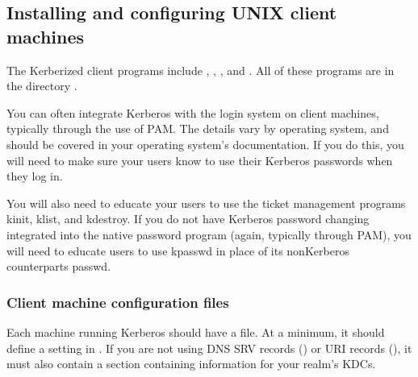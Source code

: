 \documentclass[letterpaper,10pt,english]{sphinxmanual}
\begin{document}
\subsection{Installing and configuring UNIX client machines}
\label{\detokenize{admin/install_clients:installing-and-configuring-unix-client-machines}}\label{\detokenize{admin/install_clients::doc}}
\sphinxAtStartPar
The Kerberized client programs include ,
, , and .  All of
these programs are in the directory {\hyperref[\detokenize{mitK5defaults:paths}]{}}.

\sphinxAtStartPar
You can often integrate Kerberos with the login system on client
machines, typically through the use of PAM.  The details vary by
operating system, and should be covered in your operating system’s
documentation.  If you do this, you will need to make sure your users
know to use their Kerberos passwords when they log in.

\sphinxAtStartPar
You will also need to educate your users to use the ticket management
programs kinit, klist, and kdestroy.  If you do not have Kerberos
password changing integrated into the native password program (again,
typically through PAM), you will need to educate users to use kpasswd
in place of its non\sphinxhyphen{}Kerberos counterparts passwd.


\subsubsection{Client machine configuration files}
\label{\detokenize{admin/install_clients:client-machine-configuration-files}}
\sphinxAtStartPar
Each machine running Kerberos should have a {\hyperref[\detokenize{admin/conf_files/krb5_conf:krb5-conf-5}]{}} file.
At a minimum, it should define a  setting in
{\hyperref[\detokenize{admin/conf_files/krb5_conf:libdefaults}]{}}.  If you are not using DNS SRV records
({\hyperref[\detokenize{admin/realm_config:kdc-hostnames}]{}}) or URI records ({\hyperref[\detokenize{admin/realm_config:kdc-discovery}]{}}), it must
also contain a {\hyperref[\detokenize{admin/conf_files/krb5_conf:realms}]{}} section containing information for your
realm’s KDCs.
\end{document}
